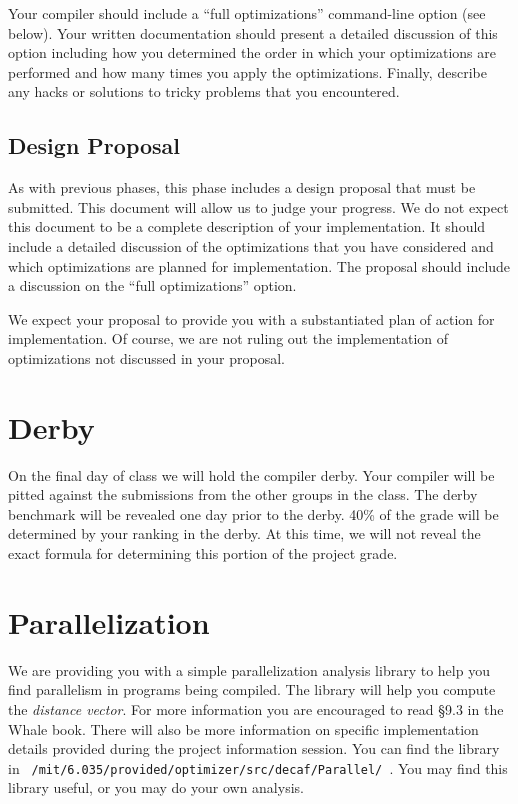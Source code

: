 Your compiler should include a ``full optimizations'' command-line
option (see below).  Your written documentation should present a
detailed discussion of this option including how you determined the
order in which your optimizations are performed and how many times you
apply the optimizations.  Finally, describe
any hacks or solutions to tricky problems that you encountered.

\subsection*{Design Proposal}
As with previous phases, this phase includes a design proposal that
must be submitted.  This document will allow us to judge your progress.  We do not expect this document to be a
complete description of your implementation.  It should include a
detailed discussion of the optimizations that you have considered and
which optimizations are planned for implementation. The proposal
should include a discussion on the ``full optimizations'' option.

We expect your proposal to provide you with a substantiated plan of
action for implementation.  Of course, we are not ruling out the
implementation of optimizations not discussed in your proposal.

\section*{Derby}
On the final day of class we will hold the compiler derby.  Your
compiler will be pitted against the submissions from the other groups
in the class. The derby benchmark will be revealed one day prior to
the derby.  40\% of the grade will be determined by your ranking in
the derby.  At this time, we will not reveal the exact formula for
determining this portion of the project grade.

\section*{Parallelization}

We are providing you with a simple parallelization analysis library
to help you find parallelism in programs being compiled. The library
will help you compute the {\em distance vector}. For more
information you are encouraged to read \S 9.3 in the Whale book.
There will also be more information on specific implementation
details provided during the project information session.
You can find the library in {\tt
/mit/6.035/provided/optimizer/src/decaf/Parallel/ }. You may find
this library useful, or you may do your own analysis.

